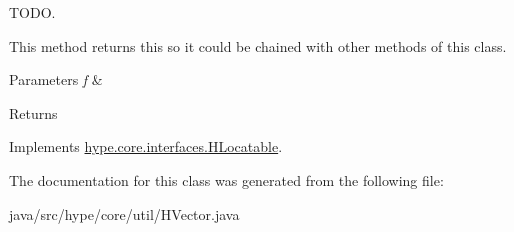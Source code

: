 T\-O\-D\-O. 

This method returns {\ttfamily this} so it could be chained with other methods of this class. 
\begin{DoxyParams}{Parameters}
{\em f} & \\
\hline
\end{DoxyParams}
\begin{DoxyReturn}{Returns}

\end{DoxyReturn}


Implements \hyperlink{interfacehype_1_1core_1_1interfaces_1_1_h_locatable_a09c6622d7e8b39fb89f3bab9562ca6b4}{hype.\-core.\-interfaces.\-H\-Locatable}.



The documentation for this class was generated from the following file\-:\begin{DoxyCompactItemize}
\item 
java/src/hype/core/util/H\-Vector.\-java\end{DoxyCompactItemize}
